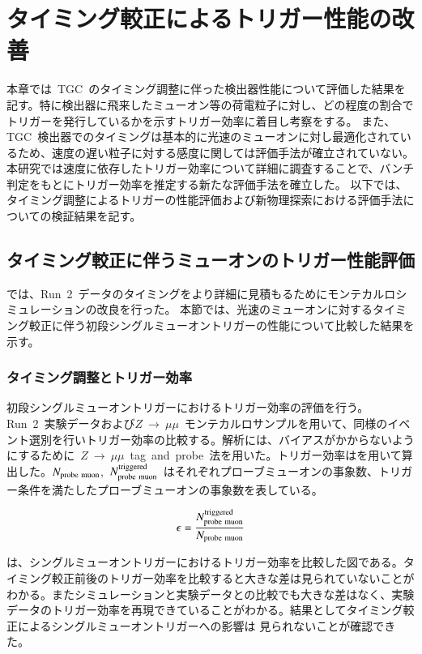 \chapter{タイミング較正によるトリガー性能の改善}
\thispagestyle{empty}
\label{chap:6}
本章では~TGC~のタイミング調整に伴った検出器性能について評価した結果を記す。特に検出器に飛来したミューオン等の荷電粒子に対し、どの程度の割合でトリガーを発行しているかを示すトリガー効率に着目し考察をする。
また、TGC~検出器でのタイミングは基本的に光速のミューオンに対し最適化されているため、速度の遅い粒子に対する感度に関しては評価手法が確立されていない。本研究では速度に依存したトリガー効率について詳細に調査することで、バンチ判定をもとにトリガー効率を推定する新たな評価手法を確立した。
以下では、タイミング調整によるトリガーの性能評価および新物理探索における評価手法についての検証結果を記す。
\section{タイミング較正に伴うミューオンのトリガー性能評価}
では、Run~2~データのタイミングをより詳細に見積もるためにモンテカルロシミュレーションの改良を行った。
本節では、光速のミューオンに対するタイミング較正に伴う初段シングルミューオントリガーの性能について比較した結果を示す。
\subsection{タイミング調整とトリガー効率}
初段シングルミューオントリガーにおけるトリガー効率の評価を行う。Run~2~実験データおよび$Z~→~\mu\mu$~モンテカルロサンプルを用いて、同様のイベント選別を行いトリガー効率の比較する。解析には、バイアスがかからないようにするために~$Z~→~\mu\mu$~tag~and~probe~法を用いた。トリガー効率はを用いて算出した。$N_{\rm{probe~muon}}$,~$N_{\rm{probe~muon}}^{\rm{triggered}}$~はそれぞれプローブミューオンの事象数、トリガー条件を満たしたプローブミューオンの事象数を表している。

\begin{align}
    \epsilon=\frac{N_{\rm{probe~muon}}^{\rm{triggered}}}{N_{\rm{probe~muon}}}
    \label{eq:eff}
\end{align}

は、シングルミューオントリガーにおけるトリガー効率を比較した図である。タイミング較正前後のトリガー効率を比較すると大きな差は見られていないことがわかる。またシミュレーションと実験データとの比較でも大きな差はなく、実験データのトリガー効率を再現できていることがわかる。結果としてタイミング較正によるシングルミューオントリガーへの影響は
見られないことが確認できた。

